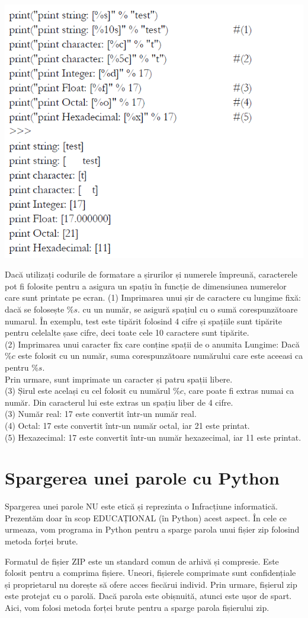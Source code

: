 \documentclass[oneside,20pt]{article}          %
\begin{document}
\begin{center}
\includegraphics[height=5 cm]{10.png}
\end{center}
Dacă utilizați codurile de formatare a șirurilor și numerele împreună,
caracterele pot fi folosite pentru a asigura un spațiu în funcție de dimensiunea
numerelor care sunt printate pe ecran.
(1) Imprimarea unui șir de caractere cu lungime fixă: dacă se folosește $\%s$.
cu un număr, se asigură spațiul cu o sumă corespunzătoare numarul. În exemplu, test este tipărit folosind 4 cifre și
spațiile sunt tipărite pentru celelalte șase cifre, deci toate cele 10 caractere sunt tipărite.\\
(2) Imprimarea unui caracter fix care conține spații de o anumita Lungime: Dacă $\%c$ este folosit cu un număr, suma
corespunzătoare numărului care este aceeasi ca pentru $\%s$.\\
Prin urmare, sunt imprimate un caracter și patru spații libere.\\
(3) Șirul este același cu cel folosit cu numărul $\%c$,
care poate fi extras numai ca număr. Din caracterul lui este extras un spațiu liber de 4 cifre.\\
(3) Număr real: 17 este convertit într-un număr real.\\
(4) Octal: 17 este convertit într-un număr octal, iar 21 este printat.\\
(5) Hexazecimal: 17 este convertit într-un număr hexazecimal, iar 11 este printat.\\

\section{Spargerea unei parole cu Python}
Spargerea unei parole NU este etică și reprezinta o Infracțiune informatică. Prezentăm doar în scop EDUCAȚIONAL (în Python) acest aspect.
În cele ce urmeaza, vom programa in Python pentru a sparge parola unui fișier zip folosind metoda forței brute.

Formatul de fișier ZIP este un standard comun de arhivă și compresie. Este folosit pentru a comprima fișiere. Uneori, fișierele comprimate sunt confidențiale și proprietarul nu dorește să ofere acces fiecărui individ. Prin urmare, fișierul zip este protejat cu o parolă. Dacă parola este obișnuită, atunci este ușor de spart. Aici, vom folosi metoda forței brute pentru a sparge parola fișierului zip.\\
\end{document}
